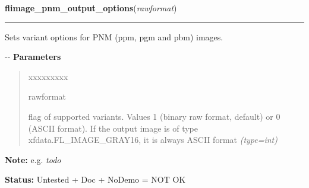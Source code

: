 \hspace{.8\funcindent}\begin{boxedminipage}{\funcwidth}

    \raggedright \textbf{flimage\_pnm\_output\_options}(\textit{rawformat})

    \vspace{-1.5ex}

    \rule{\textwidth}{0.5\fboxrule}
\setlength{\parskip}{2ex}

Sets variant options for PNM (ppm, pgm and pbm) images.

-{}-
\setlength{\parskip}{1ex}
      \textbf{Parameters}
      \vspace{-1ex}

      \begin{quote}
        \begin{Ventry}{xxxxxxxxx}

          \item[rawformat]


flag of supported variants. Values 1 (binary raw format, default)
or 0 (ASCII format). If the output image is of type
xfdata.FL\_IMAGE\_GRAY16, it is always ASCII format
            {\it (type=int)}

        \end{Ventry}

      \end{quote}

\textbf{Note:} 
e.g. \emph{todo}


\textbf{Status:} 
Untested + Doc + NoDemo = NOT OK


    \end{boxedminipage}

    \label{xformslib:flflimage:flimage_gif_output_options}

    \vspace{0.5ex}

